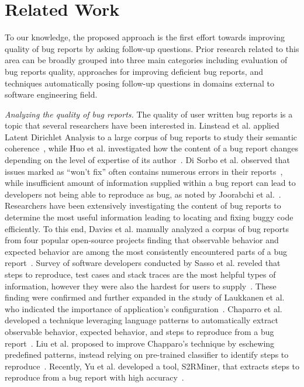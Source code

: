 \section{Related Work}
To our knowledge, the proposed approach is the first effort towards improving quality of bug reports by asking follow-up questions. Prior research related to this area can be broadly grouped into three main categories including evaluation of bug reports quality, approaches for improving deficient bug reports, and techniques automatically posing follow-up questions in domains external to software engineering field.

\noindent
{\em Analyzing the quality of bug reports.} The quality of user written bug reports is a topic that several researchers have been interested in. Linstead et al. applied Latent Dirichlet Analysis to a large corpus of bug reports to study their semantic coherence~\cite{linstead09mining}, while Huo et al. investigated how the  content of a bug report changes depending on the level of expertise of its author~\cite{Huo2014AnES}. Di Sorbo et al. observed that issues marked as ``won't fix'' often contains numerous errors in their reports~\cite{Sorbo2019WontWF}, while insufficient amount of information supplied within a bug report can lead to developers not being able to reproduce as bug, as noted by Joorabchi et al.~\cite{erfani2014works}. 
Researchers have been extensively investigating the content of bug reports to determine the most useful information leading to locating and fixing buggy code efficiently.
To this end, Davies et al. manually analyzed a corpus of bug reports from four popular open-source projects finding that observable behavior and expected behavior are among the most consistently encountered parts of a bug report~\cite{davies14whats}. Survey of software developers conducted by Sasso et al. reveled that steps to reproduce, test cases and stack traces are the most helpful types of information, however they were also the hardest for users to supply~\cite{sasso2016satisficing}. These finding were confirmed and further expanded in the study of Laukkanen et al. who indicated the importance of application's configuration~\cite{laukkanen2011survey}. Chaparro et al. developed a technique leveraging language patterns to automatically extract observable behavior, expected behavior, and steps to reproduce from a bug report~\cite{chaparro17detecting}. Liu et al. proposed to improve Chapparo's technique by eschewing predefined patterns, instead relying on pre-trained classifier to identify steps to reproduce~\cite{liu2020automated}. Recently, Yu et al. developed a tool, S2RMiner, that extracts steps to reproduce from a bug report with high accuracy~\cite{yu2019s2rminer}.
